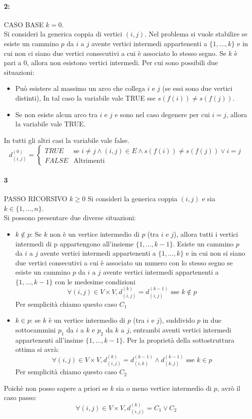 \documentclass[12pt, a4paper, openany]{book}
\begin{document}
\paragraph*{2:} CASO BASE $k=0$.
\\Si consideri la generica coppia di vertici $(i,j)$.
Nel problema si vuole stabilire se esiste un cammino $p$ da $i$ a $j$ avente vertici intermedi appartenenti a $\{1,...,k\}$ e in cui non ci siano due vertici consecutivi a cui è associato lo stesso segno.
Se $k$ è pari a 0, allora non esistono vertici intermedi.
Per cui sono possibili due situazioni:
\begin{itemize}
	\item Può esistere al massimo un arco che collega $i$ e $j$ (se essi sono due vertici distinti), In tal caso la variabile vale TRUE sse $s(f(i))\neq s(f(j))$.
	\item Se non esiste alcun arco tra $i$ e $j$ e sono nel caso degenere per cui $i=j$, allora la variabile vale TRUE.
\end{itemize}
In tutti gli altri casi la variabile vale false.
$$d^{(0)}_{(i,j)}= \begin{cases}
	TRUE & \text{se } i\neq j \wedge (i,j)\in E \wedge s(f(i)) \neq s(f(j)) \vee i=j \\
	FALSE & \text{Altrimenti}
\end{cases}
$$
\paragraph*{3} PASSO RICORSIVO $k\geq 0$
Si consideri la generica coppia $(i,j)$ e sia $k\in\{1,...,n\}$.
\\Si possono presentare due diverse situazioni:
\begin{itemize}
	\item $k\notin p$: Se $k$ non è un vertice intermedio di $p$ (tra $i$ e $j$), allora tutti i vertici intermedi di p appartengono all'insieme $\{1,...,k-1\}$.
	Esiste un cammino $p$ da $i$ a $j$ avente vertici intermedi appartenenti a $\{1,...,k\}$ e in cui non si siano due vertici consecutivi a cui è associato un numero con lo stesso segno se esiste
	un cammino $p$ da $i$ a $j$ avente vertici intermedi appartenenti a $\{1,...,k-1\}$ con le medesime condizioni
	$$\forall(i,j)\in V\times V, d^{(k)}_{(i,j)} = d^{(k-1)}_{(i,j)} \text{ sse } k\notin p$$
	Per semplicità chiamo questo caso $C_1$
	\item$k\in p$: se $k$ è un vertice intermedio di $p$ (tra $i$ e $j$), suddivido $p$ in due sottocammini $p_1$ da $i$ a $k$ e $p_2$ da $k$ a $j$,
	entrambi aventi vertici intermedi appartenenti all'insime $\{1,...,k-1\}$.
	Per la proprietà della sottostruttura ottima si avrà:
	$$\forall(i,j)\in V\times V, d^{(k)}_{(i,j)} = d^{(k-1)}_{(i,k)} \wedge d^{(k-1)}_{(k,j)} \text{ sse } k\in p$$
	Per semplicità chiamo questo caso $C_2$
\end{itemize}
Poichè non posso sapere a priori se $k$ sia o meno vertice intermedio di $p$, avrò il caso passo:
$$\forall(i,j)\in V\times V, d^{(k)}_{(i,j)} = C_1 \vee C_2$$
\end{document}

